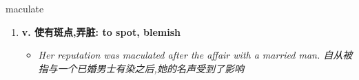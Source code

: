 
\begin{frame}
{\huge maculate}
\begin{center}
\begin{enumerate}\Large
  \item \textbf{v. 使有斑点,弄脏: to spot, blemish}
  \begin{itemize}
    \item \em{\Large{Her reputation was maculated after the affair with a married man. 自从被指与一个已婚男士有染之后,她的名声受到了影响}}
  \end{itemize}
\end{enumerate}
\end{center}
\end{frame}
